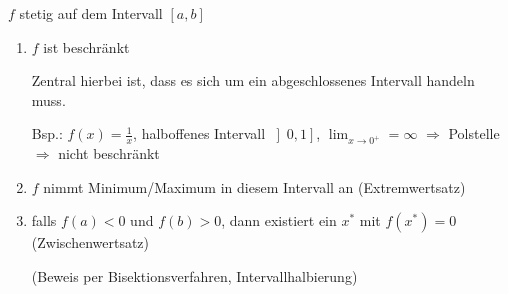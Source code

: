 $f$ stetig auf dem Intervall $\left[a,b\right]$
  \begin{enumerate}
    \item $f$ ist beschränkt
      \begin{note}
        Zentral hierbei ist, dass es sich um ein abgeschlossenes Intervall handeln muss.

        Bsp.: $f(x) = \frac 1 x$, halboffenes Intervall $\left]0,1\right]$, $\displaystyle\lim_{x\rightarrow 0^+} = \infty$ $\Rightarrow$ Polstelle $\Rightarrow$ nicht beschränkt
      \end{note}
    \item $f$ nimmt Minimum/Maximum in diesem Intervall an (Extremwertsatz)
    \item falls $f(a) < 0$ und $f(b) > 0$, dann existiert ein $x^\ast$ mit $f(x^\ast) = 0$ (Zwischenwertsatz)
    
      (Beweis per Bisektionsverfahren, Intervallhalbierung)
  \end{enumerate}
\begin{center}
\end{center}


